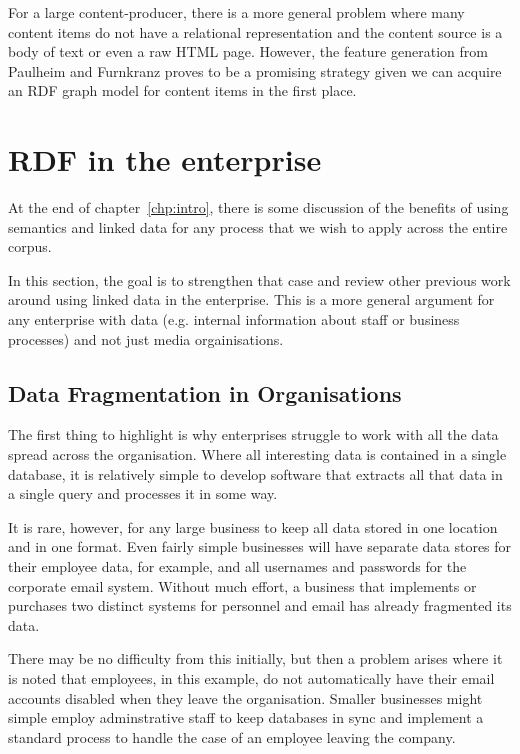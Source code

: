 For a large content-producer, there is a more general problem where many content
items do not have a relational representation and the content source is a body
of text or even a raw HTML page. However, the feature generation from Paulheim
and F\:urnkranz proves to be a promising strategy given we can acquire an RDF
graph model for content items in the first place.

\section{RDF in the enterprise}
\label{sec:linked-enterprise-data}

At the end of chapter~\ref{chp:intro}, there is some discussion of the
benefits of using semantics and linked data for any process that we wish
to apply across the entire corpus.

In this section, the goal is to strengthen that case and review other
previous work around using linked data in the enterprise. This is a more
general argument for any enterprise with data (e.g. internal information
about staff or business processes) and not just media orgainisations.

\subsection{Data Fragmentation in Organisations}

The first thing to highlight is why enterprises struggle to work with all
the data spread across the organisation. Where all interesting data is
contained in a single database, it is relatively simple to develop software
that extracts all that data in a single query and processes it in some way.

It is rare, however, for any large business to keep all data stored in
one location and in one format. Even fairly simple businesses will have
separate data stores for their employee data, for example, and all
usernames and passwords for the corporate email system. Without much effort,
a business that implements or purchases two distinct systems for personnel
and email has already fragmented its data.

There may be no difficulty from this initially, but then a problem arises
where it is noted that employees, in this example, do not automatically have
their email accounts disabled when they leave the organisation. Smaller
businesses might simple employ adminstrative staff to keep databases in
sync and implement a standard process to handle the case of an employee
leaving the company.

